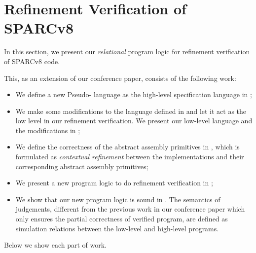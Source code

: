\section{Refinement Verification of SPARCv8}
\label{sec:refine-verification-sparc}

In this section, we present our \textit{relational}
program logic for refinement verification of
SPARCv8 code. %
{\color{blue}
This, as an extension of our conference paper,
consists of the following work:
\begin{itemize}
    \item We define a new Pseudo-\sparc{} language
        as the high-level
        specification language in
        \Sec{\ref{subsec:High-level Pseudo-SPARCv8 Language}};
    \item We make some modifications to the \sparc{}
        language defined in \Sec{\ref{sec:modeling}} and
        let it act as the low level in our refinement
        verification. We present our low-level \sparc{}
        language and the modifications in
        \Sec{\ref{subsec:low-level SPARCv8 Program}};
    \item We define the correctness of the abstract
        assembly primitives in
        \Sec{\ref{subsec:correctness-primitive}},
        which is formulated as \textit{contextual refinement}
        between the implementations and their
        corresponding abstract assembly primitives;
    \item We present a new program logic to do
        refinement verification in
        \Sec{\ref{subsec:rellogic}};
    \item We show that our new program logic is
        sound in \Sec{\ref{subsec:semantics and soundness}}.
        The semantics of judgements,
        different from the previous work
        in our conference paper which only ensures the
        partial correctness of verified program,
        are defined as simulation relations
        between the low-level and high-level programs.
\end{itemize}
Below we show each part of work.
}

